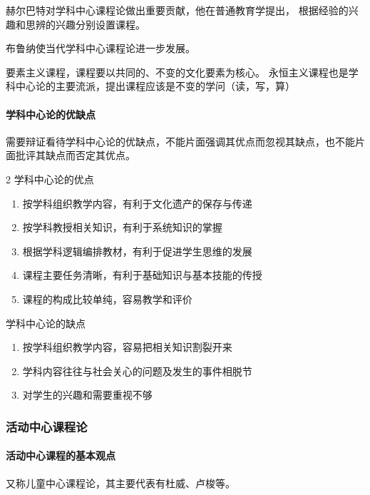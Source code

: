 \documentclass[b5paper,11pt]{article}
\begin{document}
\textcolor{ctp-red}{赫尔巴特}对学科中心课程论做出重要贡献，他在\textcolor{ctp-red}{普通教育学}提出，
根据经验的兴趣和思辨的兴趣分别设置课程。

\textcolor{ctp-red}{布鲁纳}使当代学科中心课程论进一步发展。

\textcolor{ctp-red}{要素主义课程}，\textcolor{ctp-peach}{课程要以共同的、不变的文化要素为核心}。
\textcolor{ctp-red}{永恒主义课程}也是学科中心论的主要流派，提出课程应该是\textcolor{ctp-red}{不变的学问}（读，写，算）

\paragraph{学科中心论的优缺点} 需要辩证看待学科中心论的优缺点，不能片面强调其优点而忽视其缺点，也不能片面批评其缺点而否定其优点。
\begingroup
{}
\setlength{\columnsep}{1em}
\begin{paracol}{2}
  \textcolor{ctp-red}{学科中心论的优点}
  \begin{enumerate}
    \item 按学科组织教学内容，有利于文化遗产的保存与传递
    \item 按学科教授相关知识，有利于系统知识的掌握
    \item 根据学科逻辑编排教材，有利于促进学生思维的发展
    \item 课程主要任务清晰，有利于基础知识与基本技能的传授
    \item 课程的构成比较单纯，容易教学和评价
  \end{enumerate}

  \switchcolumn

  \textcolor{ctp-red}{学科中心论的缺点}
  \begin{enumerate}
    \item 按学科组织教学内容，容易把相关知识割裂开来
    \item 学科内容往往与社会关心的问题及发生的事件相脱节
    \item 对学生的兴趣和需要重视不够
  \end{enumerate}
\end{paracol}
\endgroup

\subsubsection{活动中心课程论}
\paragraph{活动中心课程的基本观点} \textcolor{ctp-red}{又称儿童中心课程论}，其主要代表有\textcolor{ctp-red}{杜威、卢梭}等。
\end{document}
